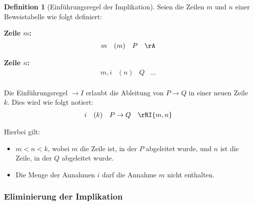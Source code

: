 \documentclass{book}
\theoremstyle{plain}
\theoremstyle{remark}
\theoremstyle{definition}
\newtheorem{definition}{Definition}[section]
\begin{document}
\begin{definition}[Einführungsregel der Implikation]
Seien die Zeilen \( m \) und \( n \) einer Beweistabelle wie folgt definiert:

\textbf{Zeile \( m \):}
\[
\begin{array}{llll}
    m & (m) & P & \rA \\
\end{array}
\]

\textbf{Zeile \( n \):}
\[
\begin{array}{llll}
    m,i & (n) & Q & \dots \\
\end{array}
\]

Die Einführungsregel \(\rightarrow I\) erlaubt die Ableitung von \( P \rightarrow Q \) in einer neuen Zeile \( k \). Dies wird wie folgt notiert:
\[
\begin{array}{llll}
    i & (k) & P \rightarrow Q & \rRI{m,n} \\
\end{array}
\]

Hierbei gilt:
\begin{itemize}
    \item \(m < n < k\), wobei \(m\) die Zeile ist, in der \(P\) abgeleitet wurde, und \(n\) ist die Zeile, in der \(Q\) abgeleitet wurde.
    \item Die Menge der Annahmen \(i\) darf die Annahme \(m\) nicht enthalten.
\end{itemize}
\end{definition}

\subsubsection{Eliminierung der Implikation}
\label{rule:RE}
\end{document}
